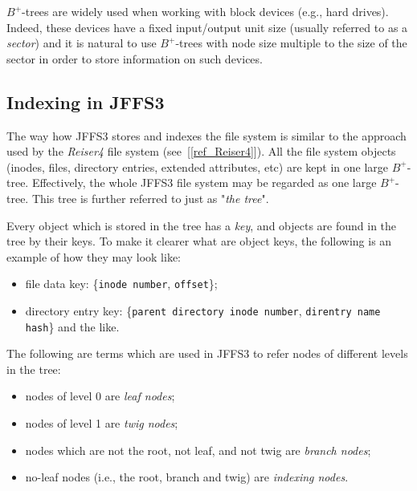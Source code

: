 \mbox{$B^+$-trees} are widely used when working with block devices (e.g., hard
drives). Indeed, these devices have a fixed input/output unit size (usually
referred to as a \emph{sector}) and it is natural to use \mbox{$B^+$-trees}
with node size multiple to the size of the sector in order to store information
on such devices.

%
%
\subsection{Indexing in JFFS3} \label{ref_SectionIndexing}

The way how JFFS3 stores and indexes the file system is similar to the approach
used by the \emph{Reiser4} file system (see~[\ref{ref_Reiser4}]). All the file
system objects (inodes, files, directory entries, extended attributes, etc) are
kept in one large \mbox{$B^+$-tree}. Effectively, the whole JFFS3 file system
may be regarded as one large \mbox{$B^+$-tree}. This tree is further referred
to just as "\emph{the tree}".

Every object which is stored in the tree has a \emph{key}, and objects are
found in the tree by their keys. To make it clearer what are object keys, the
following is an example of how they may look like:

\begin{itemize}

\item file data key: \{\texttt{inode number}, \texttt{offset}\};

\item directory entry key: \{\texttt{parent directory inode number},
\texttt{direntry name hash}\} and the like.

\end{itemize}

The following are terms which are used in JFFS3 to refer nodes of different
levels in the tree:

\begin{itemize}

\item nodes of level 0 are \emph{leaf nodes};

\item nodes of level 1 are \emph{twig nodes};

\item nodes which are not the root, not leaf, and not twig are \emph{branch
nodes};

\item \mbox{no-leaf} nodes (i.e., the root, branch and twig) are
\emph{indexing nodes}.

\end{itemize}

